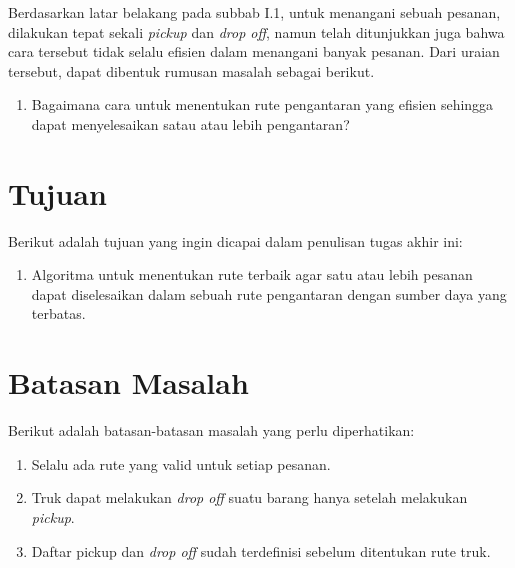 Berdasarkan latar belakang pada subbab I.1, untuk menangani sebuah pesanan, dilakukan tepat 
sekali \textit{pickup} dan \textit{drop off}, namun telah ditunjukkan juga bahwa cara tersebut 
tidak selalu efisien dalam menangani banyak pesanan. 
Dari uraian tersebut, dapat dibentuk rumusan masalah sebagai berikut.

\begin{enumerate}
    \item Bagaimana cara untuk menentukan rute pengantaran yang efisien sehingga dapat menyelesaikan satau atau lebih pengantaran?
\end{enumerate}

\section{Tujuan}

Berikut adalah tujuan yang ingin dicapai dalam penulisan tugas akhir ini:

\begin{enumerate}
    \item Algoritma untuk menentukan rute terbaik agar satu atau lebih pesanan dapat diselesaikan dalam sebuah rute pengantaran dengan sumber daya yang terbatas.
\end{enumerate}

\section{Batasan Masalah}

Berikut adalah batasan-batasan masalah yang perlu diperhatikan:

\begin{enumerate}
    \item Selalu ada rute yang valid untuk setiap pesanan.
    \item Truk dapat melakukan \textit{drop off} suatu barang hanya setelah melakukan \textit{pickup}.
    \item Daftar pickup dan \textit{drop off} sudah terdefinisi sebelum ditentukan rute truk.
\end{enumerate}

